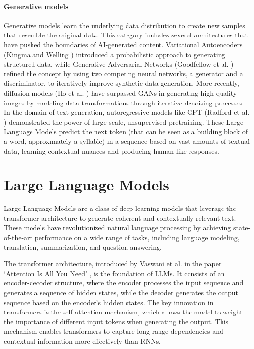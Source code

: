 \paragraph{Generative models}
Generative models learn the underlying data distribution to create new samples that
resemble the original data. This category includes several architectures that
have pushed the boundaries of AI-generated content. Variational Autoencoders (Kingma
and Welling \cite{kingma2022autoencodingvariationalbayes}) introduced a probabilistic
approach to generating structured data, while Generative Adversarial Networks (Goodfellow
et al. \cite{goodfellow2014generativeadversarialnetworks}) refined the concept by
using two competing neural networks, a generator and a discriminator, to iteratively
improve synthetic data generation. More recently, diffusion models (Ho et al. \cite{ho2020denoisingdiffusionprobabilisticmodels})
have surpassed GANs in generating high-quality images by modeling data
transformations through iterative denoising processes. In the domain of text generation,
autoregressive models like GPT (Radford et al. \cite{radford2018improving}) demonstrated
the power of large-scale, unsupervised pretraining. These Large Language Models predict
the next token (that can be seen as a building block of a word, approximately a syllable)
in a sequence based on vast amounts of textual data, learning contextual nuances
and producing human-like responses.

\section{Large Language Models}
\label{sec:large_language_models_llms}

Large Language Models are a class of deep learning models that leverage the
transformer architecture to generate coherent and contextually relevant text. These
models have revolutionized natural language processing by achieving state-of-the-art
performance on a wide range of tasks, including language modeling, translation,
summarization, and question-answering.

The transformer architecture, introduced by Vaswani et al. in the paper `Attention
Is All You Need' \cite{vaswani2023attentionneed}, is the foundation of LLMs. It consists
of an encoder-decoder structure, where the encoder processes the input sequence
and generates a sequence of hidden states, while the decoder generates the output
sequence based on the encoder's hidden states. The key innovation in
transformers is the self-attention mechanism, which allows the model to weight the
importance of different input tokens when generating the output. This mechanism
enables transformers to capture long-range dependencies and contextual
information more effectively than RNNs.

